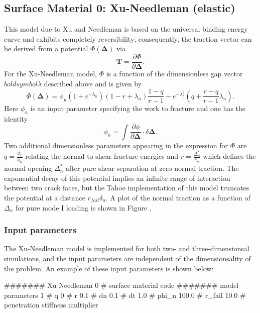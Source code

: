\subsection{Surface Material 0: Xu-Needleman (elastic)}
\label{sect.material.surface.xu}
This model due to Xu and Needleman \cite{Needleman1994} is based 
on the universal binding energy
curve and exhibits completely reversibility; consequently, the traction vector
can be derived from a potential $\Phi(\mathbf{\Delta})$ via
\begin{equation}
\mathbf{T} = \frac{\partial \Phi}{\partial \mathbf{\Delta}}.
\end{equation}
For the Xu-Needleman model, $\Phi$ is a function of the dimensionless
gap vector $boldsymbol{\lambda}$ described above and is given by 
\begin{equation}
\Phi(\mathbf{\Delta}) = \phi_n (1+e^{-\lambda_n}) (1-r+\lambda_n)\frac{1-q}{r-1}-e^{-\lambda_t^2} ( q+\frac{r-q}{r-1}\lambda_n ).
\end{equation}
Here $\phi_n$ is an input parameter specifying the work to fracture and one has
the identity
\begin{equation}
\phi_n = \int \frac{\partial \phi}{\partial \mathbf{\Delta}}\cdot \delta \mathbf{\Delta}.
\end{equation}
Two additional dimensionless parameters appearing in the expression for
$\Phi$ are $q = \frac{\phi_t}{\phi_n}$
relating the normal to shear fracture energies and $r = \frac{\Delta_n^*}{\delta_n}$
which defines the normal opening $\Delta_n^*$ after pure shear separation at zero
normal traction. The exponential decay of this potential implies an infinite range
of interaction between two crack faces, but the Tahoe implementation of this
model truncates the potential at a distance $r_{fail} \delta_n$. A plot
of the normal traction as a function of $\Delta_n$ for pure mode I loading
is shown in Figure . 

\subsubsection{Input parameters}

The Xu-Needleman model is implemented for both two- and three-dimensionsal
simulations, and the input parameters are independent of the dimensionsality
of the problem.  An example of these input parameters is shown below:
\begin{inputfile}
####### Xu Needleman
0     # surface material code
####### model parameters
1     # q
0     # r
0.1   # dn
0.1   # dt
1.0   # phi_n
100.0 # r_fail
10.0  # penetration stiffness multiplier 
\end{inputfile}

